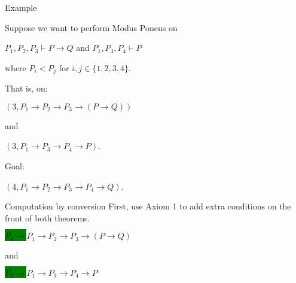 \documentclass[presentation]{beamer}
\begin{document}
\begin{frame}[label={sec:orgheadline20}]{Example}
\begin{block}{Suppose we want to perform Modus Ponens on}
\begin{center}
\(P_1, P_2, P_3 \vdash P \rightarrow Q\) and \(P_1, P_3, P_4 \vdash P\)
\end{center}

where \(P_i < P_j\) for \(i,j \in \{1,2,3,4\}\).
\end{block}

\begin{block}{That is, on:}
\begin{center}
\((3, P_1 \rightarrow P_2 \rightarrow P_3 \rightarrow (P \rightarrow Q))\)
\end{center}
and 
\begin{center}
\((3,P_1 \rightarrow P_3 \rightarrow P_4 \rightarrow P)\).
\end{center}
\end{block}

\begin{block}{Goal:}
\begin{center}
\((4,P_1 \rightarrow P_2 \rightarrow P_3 \rightarrow P_4 \rightarrow Q)\).
\end{center}
\end{block}
\end{frame}

\begin{frame}[label={sec:orgheadline21}]{Computation by conversion}
First, use Axiom 1 to add extra conditions on the front of both theorems.

\begin{center}
\colorbox{green}{$P_4 \rightarrow$}\(P_1 \rightarrow P_2 \rightarrow P_3 \rightarrow (P \rightarrow Q)\)
\end{center}

and 

\begin{center}
\colorbox{green}{$P_2 \rightarrow$}\(P_1 \rightarrow P_3 \rightarrow P_4 \rightarrow P\)
\end{center}
\end{frame}
\end{document}
